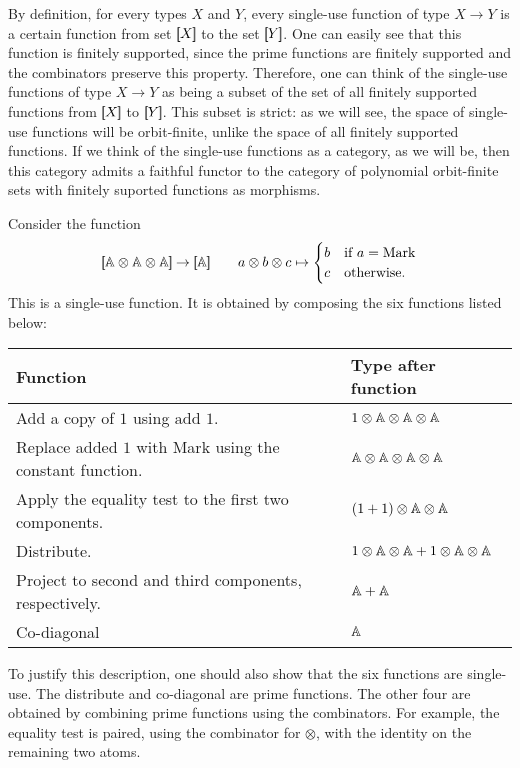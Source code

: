 By definition, for every types $X$ and $Y$, every single-use function of type $X \to Y$ is a certain function from set $[\!\![X]\!\!]$ to the set $[\!\![Y]\!\!]$. One can easily see that this function is  finitely supported, since the prime functions are finitely supported and the combinators preserve this property.  Therefore, one can think of the single-use functions of type $X \to Y$ as being a subset of the set of all finitely supported functions from $[\!\![X]\!\!]$ to $[\!\![Y]\!\!]$. This subset is strict: as we will see, the space of single-use functions will be orbit-finite, unlike the space of all finitely supported functions. If we think of the single-use functions as a category, as we will be, then this category admits a faithful functor to the category of polynomial orbit-finite sets with finitely suported functions as morphisms.


\begin{example}\label{ex:six-compositions}
    Consider the function 
    \begin{align*}
    \sem{\atoms \otimes \atoms \otimes \atoms} \to \sem \atoms  \qquad a \otimes b \otimes c \mapsto \begin{cases}
        b & \text{if } a = \text{Mark} \\
        c & \text{otherwise}.
    \end{cases}
    \end{align*}
    This is a single-use function. It is obtained by composing the six functions listed below:

\begin{center}
    \begin{tabular}{ll}
        Function & Type after function \\
        \hline
        Add a copy of $1$ using $\text{add 1}$. & $1 \otimes \mathbb A \otimes \mathbb A \otimes \mathbb A$ \\
        Replace added $1$ with Mark using the constant function. & $\mathbb A \otimes \mathbb A \otimes \mathbb A \otimes \mathbb A$ \\
        Apply the equality test to the first two components. & $(1+1) \otimes \mathbb A \otimes \mathbb A$ \\
        Distribute. & $1 \otimes \mathbb A \otimes \mathbb A +  1 \otimes \mathbb A \otimes \mathbb A$ \\
        Project to second and third components, respectively. & $\mathbb A + \mathbb A$ \\
        Co-diagonal & $\mathbb A$ 
    \end{tabular}
\end{center}
To justify this description, one should also show that the six functions are single-use. The distribute and co-diagonal are prime functions. The other four are obtained by combining prime functions using the combinators. For example, the equality test is paired, using the combinator for $\otimes$, with the identity on the remaining two atoms. 
\end{example}

